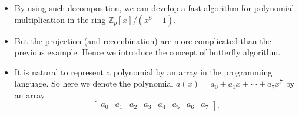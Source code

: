 \begin{frame}
    \begin{itemize}
        \item By using such decomposition, we can develop a fast algorithm for 
            polynomial multiplication in the ring \( \mathbb{Z}_{p}[x]/(x^{8}-1) \).
        \item But the projection (and recombination) are more complicated than the 
            previous example. Hence we introduce the concept of butterfly algorithm.
        \item It is natural to represent a polynomial by an array in the programming language.
            So here we denote the polynomial \( a(x) = a_{0} + a_{1}x + \cdots + a_{7}x^{7} \) by 
            an array
            \[
                \begin{bmatrix}
                    a_{0} & a_{1} & a_{2} & a_{3} & a_{4} & a_{5} & a_{6} & a_{7}
                \end{bmatrix}.
            \]

    \end{itemize}
\end{frame}

